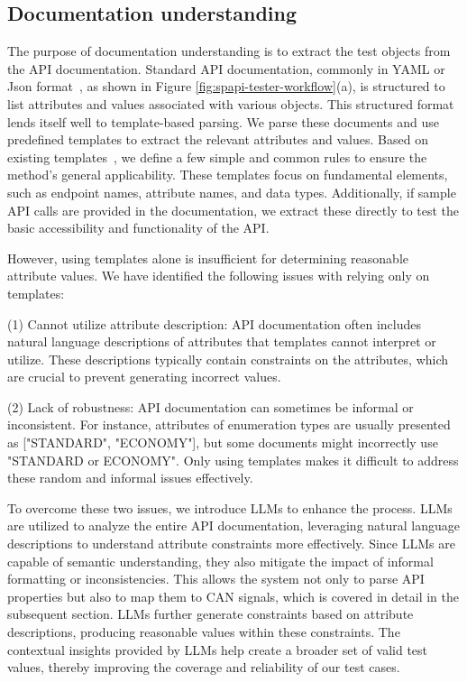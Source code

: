 \subsection{Documentation understanding}
The purpose of documentation understanding is to extract the test objects from the API documentation.
Standard API documentation, commonly in YAML or Json format~\cite{openapi2023}, as shown in Figure \ref{fig:spapi-tester-workflow}(a), is structured to list attributes and values associated with various objects. This structured format lends itself well to template-based parsing.
We parse these documents and use predefined templates to extract the relevant attributes and values. Based on existing templates~\cite{openapitemplate2024}, we define a few simple and common rules to ensure the method's general applicability.
These templates focus on fundamental elements, such as endpoint names, attribute names, and data types. Additionally, if sample API calls are provided in the documentation, we extract these directly to test the basic accessibility and functionality of the API.

However, using templates alone is insufficient for determining reasonable attribute values. We have identified the following issues with relying only on templates:

(1) Cannot utilize attribute description: API documentation often includes natural language descriptions of attributes that templates cannot interpret or utilize. These descriptions typically contain constraints on the attributes, which are crucial to prevent generating incorrect values. 


(2) Lack of robustness: API documentation can sometimes be informal or inconsistent. For instance, attributes of enumeration types are usually presented as ["STANDARD", "ECONOMY"], but some documents might incorrectly use "STANDARD or ECONOMY". Only using templates makes it difficult to address these random and informal issues effectively.

To overcome these two issues, we introduce LLMs to enhance the process.
LLMs are utilized to analyze the entire API documentation, leveraging natural language descriptions to understand attribute constraints more effectively. Since LLMs are capable of semantic understanding, they also mitigate the impact of informal formatting or inconsistencies. This allows the system not only to parse API properties but also to map them to CAN signals, which is covered in detail in the subsequent section. 
LLMs further generate constraints based on attribute descriptions, producing reasonable values within these constraints. The contextual insights provided by LLMs help create a broader set of valid test values, thereby improving the coverage and reliability of our test cases.

